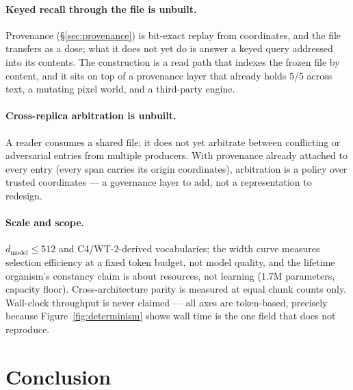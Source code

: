 \documentclass[11pt]{article}
\theoremstyle{definition}
\begin{document}
\paragraph{Keyed recall through the file is unbuilt.} Provenance
(\S\ref{sec:provenance}) is bit-exact replay from coordinates, and the file
transfers as a dose; what it does not yet do is answer a keyed query addressed
into its contents. The construction is a read path that indexes the frozen file
by content, and it sits on top of a provenance layer that already holds 5/5
across text, a mutating pixel world, and a third-party engine.

\paragraph{Cross-replica arbitration is unbuilt.} A reader consumes a shared
file; it does not yet arbitrate between conflicting or adversarial entries from
multiple producers. With provenance already attached to every entry (every span
carries its origin coordinates), arbitration is a policy over trusted
coordinates --- a governance layer to add, not a representation to redesign.

\paragraph{Scale and scope.} $d_\text{model}\le 512$ and C4/WT-2-derived
vocabularies; the width curve measures selection efficiency at a fixed token
budget, not model quality, and the lifetime organism's constancy claim is about
resources, not learning (1.7M parameters, capacity floor). Cross-architecture
parity is measured at equal chunk counts only. Wall-clock throughput is never
claimed --- all axes are token-based, precisely because
Figure~\ref{fig:determinism} shows wall time is the one field that does not
reproduce.

\section{Conclusion}
\label{sec:conclusion}
\end{document}
